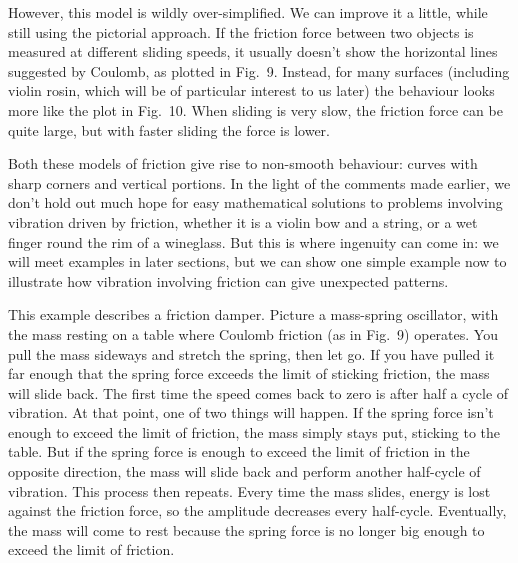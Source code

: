 
  However, this model is wildly over-simplified. We can improve it a little, 
  while still using the pictorial approach. If the friction force between two 
  objects is measured at different sliding speeds, it usually doesn't show the 
  horizontal lines suggested by Coulomb, as plotted in Fig.\ 9. Instead, for 
  many surfaces (including violin rosin, which will be of particular interest 
  to us later) the behaviour looks more like the plot in Fig.\ 10. When sliding 
  is very slow, the friction force can be quite large, but with faster sliding 
  the force is lower. 


  Both these models of friction give rise to non-smooth behaviour: curves with 
  sharp corners and vertical portions. In the light of the comments made 
  earlier, we don't hold out much hope for easy mathematical solutions to 
  problems involving vibration driven by friction, whether it is a violin bow 
  and a string, or a wet finger round the rim of a wineglass. But this is where 
  ingenuity can come in: we will meet examples in later sections, but we can 
  show one simple example now to illustrate how vibration involving friction 
  can give unexpected patterns. 

  This example describes a friction damper. Picture a mass-spring oscillator, 
  with the mass resting on a table where Coulomb friction (as in Fig.\ 9) 
  operates. You pull the mass sideways and stretch the spring, then let go. If 
  you have pulled it far enough that the spring force exceeds the limit of 
  sticking friction, the mass will slide back. The first time the speed comes 
  back to zero is after half a cycle of vibration. At that point, one of two 
  things will happen. If the spring force isn't enough to exceed the limit of 
  friction, the mass simply stays put, sticking to the table. But if the spring 
  force is enough to exceed the limit of friction in the opposite direction, 
  the mass will slide back and perform another half-cycle of vibration. This 
  process then repeats. Every time the mass slides, energy is lost against the 
  friction force, so the amplitude decreases every half-cycle. Eventually, the 
  mass will come to rest because the spring force is no longer big enough to 
  exceed the limit of friction. 

